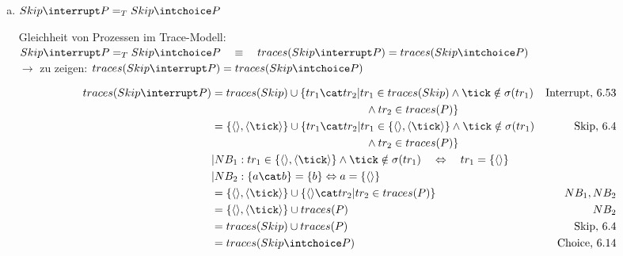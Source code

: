 \documentclass{scrreprt}
\begin{document}
\begin{enumerate}[a)]
\item{
  $ Skip \interrupt P =_T Skip \intchoice P $

  Gleichheit von Prozessen im Trace-Modell:\\
  $Skip \interrupt P =_T Skip \intchoice P \hspace{10pt} \equiv \hspace{10pt} traces(Skip \interrupt P) = traces(Skip \intchoice P) $ \\

  $\rightarrow$ zu zeigen: $traces(Skip \interrupt P) = traces(Skip \intchoice P)$

  \begin{align*}
    traces(Skip \interrupt P) &= traces(Skip) \cup \{tr_1 \cat tr_2 | tr_1 \in traces(Skip) \wedge \tick \notin \sigma(tr_1) & \text{Interrupt, 6.53}\\
                              &\hspace{4.9cm} \wedge tr_2 \in traces(P) \}\\
                              &= \{ \langle \rangle, \langle \tick \rangle \} \cup \{ tr_1 \cat tr_2 | tr_1 \in \{ \langle \rangle, \langle \tick \rangle \} \wedge \tick \notin \sigma(tr_1) & \text{Skip, 6.4}\\
                              &\hspace{4.9cm} \wedge tr_2 \in traces(P) \}\\
                              &|NB_1: tr_1 \in \{ \langle \rangle, \langle \tick \rangle \} \wedge \tick \notin \sigma(tr_1) \hspace{10pt} \Leftrightarrow \hspace{10pt} tr_1 = \{ \langle \rangle \}\\
                              &|NB_2: \{a \cat b\} = \{ b \} \Leftrightarrow a = \{ \langle \rangle \}\\
                              &= \{ \langle \rangle, \langle \tick \rangle \} \cup \{ \langle \rangle \cat tr_2 | tr_2 \in traces(P) \} & NB_1, NB_2\\
                              &= \{ \langle \rangle, \langle \tick \rangle \} \cup traces(P) & NB_2\\
                              &= traces(Skip) \cup traces(P) & \text{Skip, 6.4}\\
                              &= traces(Skip \intchoice P) & \text{Choice, 6.14}
  \end{align*}

  \flushright{\qedsymbol}\\
}
\end{enumerate}
\end{document}
